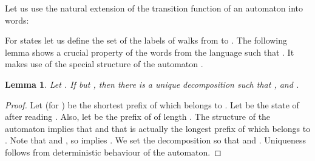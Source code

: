 \documentclass{article}
\newcommand{\mayqed}{}
\newtheorem{lemma}[theorem]{Lemma}
\theoremstyle{definition}
\theoremstyle{remark}
\begin{document}
Let us use the natural extension of the transition function of an automaton into words:

For states  let us define the set 
of the labels of walks from  to .
The following lemma shows a crucial property of the words  from the language 
such that .
It makes use of the special structure of the automaton .

\begin{lemma}\label{lem:comb_crucial}
  Let . If  but ,
  then there is a unique decomposition  such that ,  and
  . 
\end{lemma}
\begin{proof}
  Let  (for ) be the shortest prefix of  which belongs to .
  Let  be the state of  after reading . 
  Also, let  be the prefix of  of length . 
  The structure of the automaton implies that  and that
   is actually the longest prefix of  which belongs to .
  Note that  and , so  implies .
  We set the decomposition so that  and .
  Uniqueness follows from deterministic behaviour of the automaton.
\mayqed\end{proof}
\end{document}
